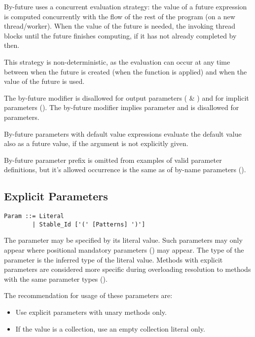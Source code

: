 By-future uses a concurrent evaluation strategy: the value of a future expression is computed concurrently with the flow of the rest of the program (on a new thread/worker). When the value of the future is needed, the invoking thread blocks until the future finishes computing, if it has not already completed by then. 

This strategy is non-deterministic, as the evaluation can occur at any time between when the future is created (when the function is applied) and when the value of the future is used. 

The by-future modifier is disallowed for output parameters ( \& ) and for implicit parameters (). The by-future modifier implies  parameter and is disallowed for  parameters. 

By-future parameters with default value expressions evaluate the default value also as a future value, if the argument is not explicitly given. 

By-future parameter prefix is omitted from examples of valid parameter definitions, but it's allowed occurrence is the same as of by-name parameters (). 





\subsection{Explicit Parameters}
\label{sec:explicit-parameters}

\syntax\begin{lstlisting}
Param ::= Literal 
        | Stable_Id ['(' [Patterns] ')']
\end{lstlisting}

The parameter may be specified by its literal value. Such parameters may only appear where positional mandatory parameters () may appear. The type of the parameter is the inferred type of the literal value. Methods with explicit parameters are considered more specific during overloading resolution to methods with the same parameter types (). 

The recommendation for usage of these parameters are: 
\begin{itemize}
  \item Use explicit parameters with unary methods only. 
  \item If the value is a collection, use an empty collection literal only. 
\end{itemize}


